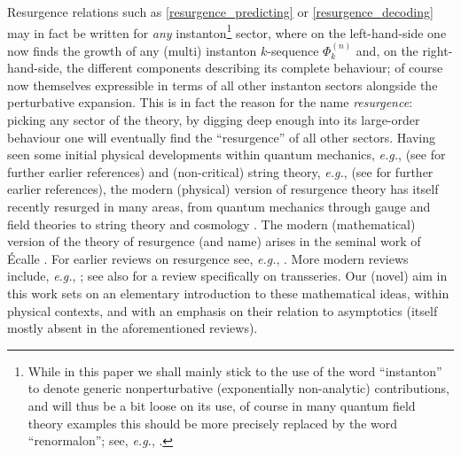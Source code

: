 \documentclass[11pt,a4paper]{article}
\begin{document}
Resurgence relations such as \eqref{resurgence_predicting} or \eqref{resurgence_decoding} may in fact be written for \textit{any} instanton\footnote{While in this paper we shall mainly stick to the use of the word ``instanton'' to denote generic nonperturbative (exponentially non-analytic) contributions, and will thus be a bit loose on its use, of course in many quantum field theory examples this should be more precisely replaced by the word ``renormalon''; see, \textit{e.g.}, \cite{b98}.} sector, where on the left-hand-side one now finds the growth of any (multi) instanton $k$-sequence $\Phi^{(n)}_{k}$ and, on the right-hand-side, the different components describing its complete behaviour; of course now themselves expressible in terms of all other instanton sectors alongside the perturbative expansion. This is in fact the reason for the name \textit{resurgence}: picking any sector of the theory, by digging deep enough into its large-order behaviour one will eventually find the ``resurgence'' of all other sectors. Having seen some initial physical developments within quantum mechanics, \textit{e.g.}, \cite{bw69, bw73, bow77, cs78, sr78, bpv78a, bpv78b, v80, b80, z81a, z81c, hdgclc82, z83, v83, z84, shcp85, s85, ddp90, ddp93, v93, v94a, v94b, ddp97, dp97, v00} (see \cite{z81b} for further earlier references) and (non-critical) string theory, \textit{e.g.}, \cite{gp88, bmp90, s90, gz91, ez92, ez93} (see \cite{fgz93} for further earlier references), the modern (physical) version of resurgence theory has itself recently resurged in many areas, from quantum mechanics \cite{ac00a, ac00b, ahs02, z03, zj04a, zj04b, jz04, a04, jsz10, jz11, du13, bdu13, as13, ggs13, du14, mns15, gt15, fkmns16, gt16, su16, du16c, kstu16, ssv16, cm16, bdu17, fkmns17a, ssv17, fkmns17b, gs17, cms17, h1712} through gauge and field theories \cite{s02, msw07, m08, msw08, ps09, mpp09, sw09, asv11, r12, au12a, au12b, m10, du12a, du12b, sv13, cddu13, as13, cdu14, mns14a, mns14b, cku14, ars14, bc14, mns14c, csv15, bd15, dsu15, hs15, hj15, kt15, du15, a15, dh15, bd15b, bdssu15, as15, k16, h16a, mns16, ddt16, h16b, gmp16, fkmns16, ads16, g16, du16c, rt16, bc16, m17, b17, c1701, m_b17, yy17, cd17, acpy17, ad17, h1710, dg17, bcgmp17, hy17, cgm17, mv18, mpn18} to string theory \cite{m06, msw07, m08, glm08, msw08, em08, gm08, ps09, mpp09, gikm10, kmr10, dmp11, asv11, m10, sv13, as13, cesv13, gmz14, cesv14, v15, ho15, c15, csv16, cms16, cm16, gs17, cms17, c1712} and cosmology \cite{bhn16, flt17a, flt17b, dhhhj17, flt17c, bccs17}. The modern (mathematical) version of the theory of resurgence (and name) arises in the seminal work of \'Ecalle \cite{e81}. For earlier reviews on resurgence see, \textit{e.g.}, \cite{cnp93a, cnp93b, c95, c98, c98b, b99, dp99, ss03, kt05}. More modern reviews include, \textit{e.g.}, \cite{o05a, o05b, d06, s07, m10, s14, d14, d2014, du15b, m15, du16a, du16b, ms16, lr16, d16, p16, mvb17, bh17}; see also \cite{e08} for a review specifically on transseries. Our (novel) aim in this work sets on an elementary introduction to these mathematical ideas, within physical contexts, and with an emphasis on their relation to asymptotics (itself mostly absent in the aforementioned reviews).
\end{document}

